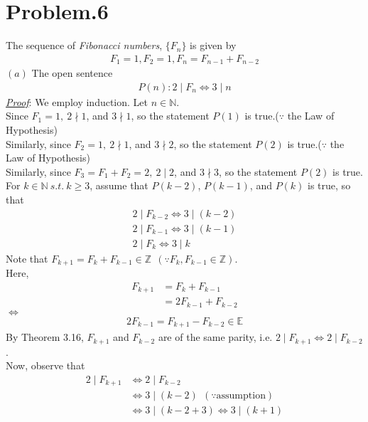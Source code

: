 \documentclass[12pt]{article}
\begin{document}
\section*{Problem.6}
The sequence of \textit{Fibonacci numbers}, $\{ F_n \} $ is given by
\begin{gather*}
F_1 = 1, F_2 = 1, F_n = F_{n-1} + F_{n-2}
\end{gather*}
$(a)$
The open sentence
\begin{gather*}
P(n): 2 \mid F_n \Leftrightarrow 3 \mid n
\end{gather*}
\underline{\textit{Proof}}: We employ induction. Let $n \in \mathbb{N}$.\\[1em]
Since $F_1 = 1,~ 2 \nmid 1$, and $3 \nmid 1$, so the statement $P(1)$ is true.($\because$ the Law of Hypothesis)\\
Similarly, since $F_2 = 1,~ 2 \nmid 1$, and $3 \nmid 2$, so the statement $P(2)$ is true.($\because$ the Law of Hypothesis)\\[1em]
Similarly, since $F_3 = F_1 + F_2 = 2,~ 2 \mid 2$, and $3 \nmid 3$, so the statement $P(2)$ is true.\\[1em]
For $k \in \mathbb{N} ~s.t.~ k \geq 3$, assume that $P(k-2)$, $P(k-1)$, and $P(k)$ is true, so that 
\begin{gather*}
2 \mid F_{k-2} \Leftrightarrow 3 \mid (k-2)\\[1em]
2 \mid F_{k-1} \Leftrightarrow 3 \mid (k-1)\\[1em]
2 \mid F_k \Leftrightarrow 3 \mid k
\end{gather*}
Note that $F_{k+1} = F_{k} + F_{k-1} \in \mathbb{Z} ~~\left( \because F_{k}, F_{k-1} \in \mathbb{Z} \right)$.\\
Here,
\begin{align*}
F_{k+1} &= F_{k} + F_{k-1}\\[1em]
&= 2 F_{k-1} + F_{k-2}
\end{align*}
$\Leftrightarrow$
\begin{gather*}
2 F_{k-1} = F_{k+1} - F_{k-2} \in \mathbb{E}
\end{gather*}
By Theorem 3.16, $F_{k+1}$ and $F_{k-2}$ are of the same parity, i.e. $2 \mid F_{k+1} \Leftrightarrow 2 \mid F_{k-2}$.\\
Now, observe that
\begin{align*}
2 \mid F_{k+1} &\Leftrightarrow 2 \mid F_{k-2}\\[1em]
&\Leftrightarrow 3 \mid (k-2) ~~\left( \because \mathrm{assumption}\right)\\[1em]
&\Leftrightarrow 3 \mid (k-2 + 3) \Leftrightarrow 3 \mid (k + 1)
\end{align*}
\end{document}
